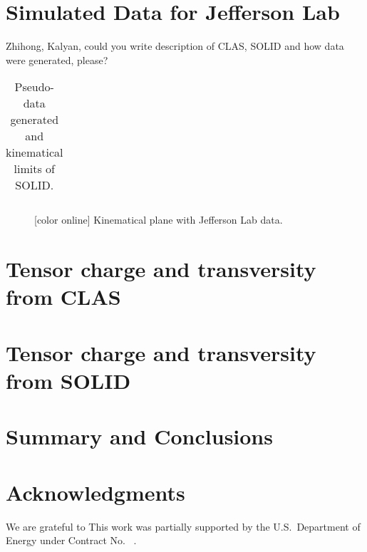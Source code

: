 \documentclass[twocolumn,showpacs,preprintnumbers,amsmath,amssymb,floatfix,prd]{revtex4}
\newcommand*{\BibPath}{.}%
\def\AP#1{{\color{blue} #1}}
\begin{document}
\section{Simulated Data for Jefferson Lab}
%
\AP{Zhihong, Kalyan, could you write description of CLAS, SOLID and how data were generated, please?}
 
%
%
\begin{table}[bth!]
\begin{tabular}{ccccc}
\end{tabular}
\caption{\label{tab:kinem} Pseudo-data generated and kinematical limits of SOLID.}
\end{table}
%


%
\begin{figure}[thb!]
\vspace*{-0.4cm}
\begin{center}
\vspace*{-0.6cm}
 \end{center}
\vspace*{-0.7cm}
\caption{\label{fig:kimen} [color online]
Kinematical plane with Jefferson Lab data.}
\end{figure}
%
 

\section{Tensor charge and transversity from CLAS}
 
\section{Tensor charge and transversity from SOLID}

\section{Summary and Conclusions}
%
 

\section*{Acknowledgments}
%
We are grateful to  
This work was partially supported by   the
U.S.\ Department of Energy under Contract No.~ .


 
\end{document}
